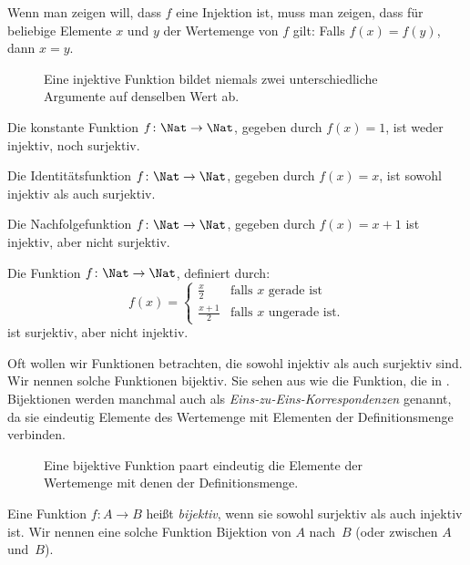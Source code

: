 \documentclass[../../../include/open-logic-section]{subfiles}
\begin{document}
\begin{explain}
Wenn man zeigen will, dass $f$ eine Injektion ist, muss man zeigen, dass
für beliebige Elemente $x$ und $y$ der Wertemenge von $f$ gilt: Falls $f(x)=f(y)$, dann
$x=y$. 
\begin{figure}
  \caption{Eine injektive Funktion bildet niemals zwei unterschiedliche
    Argumente auf denselben Wert ab.}
\end{figure}
\end{explain}

\begin{ex}
Die konstante Funktion $f\colon \Nat \to \Nat$, gegeben durch $f(x) = 1$, ist
weder injektiv, noch surjektiv.

Die Identitätsfunktion $f\colon \Nat \to \Nat$, gegeben durch $f(x) = x$, ist
sowohl injektiv als auch surjektiv.

Die Nachfolgefunktion $f \colon \Nat \to \Nat$, gegeben durch $f(x) = x+1$
ist injektiv, aber nicht surjektiv.
  
Die Funktion $f \colon \Nat \to \Nat$, definiert durch:
\[
  f(x) =
  \begin{cases}
    \frac{x}{2} & \text{falls $x$ gerade ist} \\
    \frac{x+1}{2} & \text{falls $x$ ungerade ist.}
  \end{cases}
\]
ist surjektiv, aber nicht injektiv.
\end{ex}

\begin{explain}
Oft wollen wir Funktionen betrachten, die sowohl
injektiv als auch surjektiv sind. Wir nennen solche Funktionen
bijektiv. Sie sehen aus wie die Funktion, die in
. Bijektionen werden manchmal auch als
\emph{Eins-zu-Eins-Korrespondenzen} genannt, da sie eindeutig Elemente
des Wertemenge mit Elementen der Definitionsmenge verbinden.
\begin{figure}
  \caption{Eine bijektive Funktion paart eindeutig die Elemente der
    Wertemenge mit denen der Definitionsmenge.}
\end{figure}
\end{explain}

\begin{defn}[Bijektion] 
Eine Funktion $f \colon A \to B$ heißt \emph{bijektiv}, wenn sie sowohl
surjektiv als auch injektiv ist. Wir nennen eine solche Funktion
Bijektion von $A$ nach~$B$ (oder zwischen $A$ und~$B$).
\end{defn}
\end{document}
